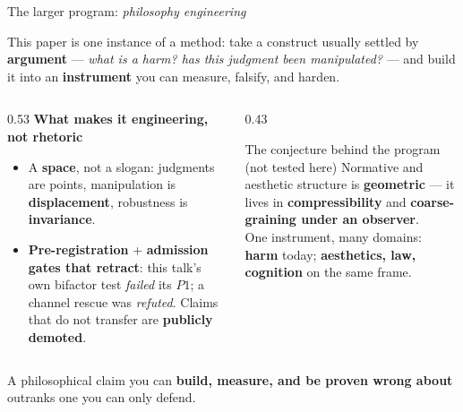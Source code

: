\documentclass[aspectratio=169,11pt]{beamer}
\newcommand{\hi}[1]{\textcolor{cbblue}{\textbf{#1}}}
\newcommand{\gold}[1]{\textcolor{cborange}{\textbf{#1}}}
\begin{document}
\begin{frame}{The larger program: \emph{philosophy engineering}}
{\small This paper is one instance of a method: take a construct usually settled by \hi{argument} --- \emph{what is a harm? has this judgment been manipulated?} --- and build it into an \gold{instrument} you can measure, falsify, and harden.\par}
\vfill
\begin{columns}[T]
\begin{column}{0.53\textwidth}
\textbf{\small What makes it engineering, not rhetoric}
\begin{itemize}
  \item \small A \hi{space}, not a slogan: judgments are points, manipulation is \hi{displacement}, robustness is \hi{invariance}.
  \item \small \hi{Pre-registration} + \hi{admission gates that retract}: this talk's own bifactor test \emph{failed} its $P1$; a channel rescue was \emph{refuted}. Claims that do not transfer are \gold{publicly demoted}.
\end{itemize}
\end{column}
\begin{column}{0.43\textwidth}
\begin{block}{\small The conjecture behind the program {\scriptsize(not tested here)}}
\small Normative and aesthetic structure is \gold{geometric} --- it lives in \hi{compressibility} and \hi{coarse-graining under an observer}.\\[3pt]
One instrument, many domains: \hi{harm} today; \hi{aesthetics, law, cognition} on the same frame.
\end{block}
\end{column}
\end{columns}
\vfill
{\scriptsize A philosophical claim you can \gold{build, measure, and be proven wrong about} outranks one you can only defend.}
\end{frame}
\end{document}

